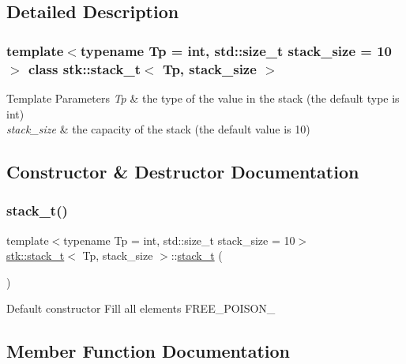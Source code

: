 \subsection{Detailed Description}
\subsubsection*{template$<$typename Tp = int, std\+::size\+\_\+t stack\+\_\+size = 10$>$\newline
class stk\+::stack\+\_\+t$<$ Tp, stack\+\_\+size $>$}


\begin{DoxyTemplParams}{Template Parameters}
{\em Tp} & the type of the value in the stack (the default type is int) \\
\hline
{\em stack\+\_\+size} & the capacity of the stack (the default value is 10) \\
\hline
\end{DoxyTemplParams}


\subsection{Constructor \& Destructor Documentation}
\mbox{\label{classstk_1_1stack__t_ab7605ffb3efbfdaf23c1411dba8076d7}} 
\subsubsection{\texorpdfstring{stack\+\_\+t()}{stack\_t()}}
{\footnotesize\ttfamily template$<$typename Tp  = int, std\+::size\+\_\+t stack\+\_\+size = 10$>$ \\
\hyperlink{classstk_1_1stack__t}{stk\+::stack\+\_\+t}$<$ Tp, stack\+\_\+size $>$\+::\hyperlink{classstk_1_1stack__t}{stack\+\_\+t} (\begin{DoxyParamCaption}{ }\end{DoxyParamCaption})\hspace{0.3cm}{\ttfamily [inline]}}

Default constructor Fill all elements F\+R\+E\+E\+\_\+\+P\+O\+I\+S\+O\+N\+\_\+ 

\subsection{Member Function Documentation}
\mbox{\label{classstk_1_1stack__t_ac6b1f910422f3402f4ffcc8d496d0273}} 
